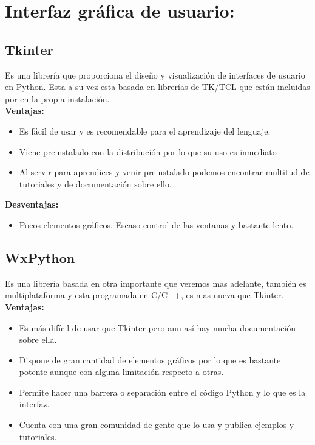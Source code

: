 
\section{Interfaz gráfica de usuario:}
\subsection{Tkinter}
Es una librería que proporciona el diseño y visualización de interfaces de usuario en Python. Esta a su vez esta basada en librerías de TK/TCL que están incluidas por en la propia instalación.
\\

\textbf{Ventajas:}

\begin{itemize}
\item Es fácil de usar y es recomendable para el aprendizaje del lenguaje.

\item Viene preinstalado con la distribución por lo que su uso es inmediato

\item Al servir para aprendices y venir preinstalado podemos encontrar multitud de tutoriales y de documentación sobre ello.
\end{itemize}

\textbf{Desventajas:}

\begin{itemize}
\item Pocos elementos gráficos. Escaso control de las ventanas y bastante lento.
\end{itemize}

\subsection{WxPython}
Es una librería basada en otra importante que veremos mas adelante, también es multiplataforma y esta programada en C/C++, es mas nueva que Tkinter.
\\

\textbf{Ventajas:}

\begin{itemize}
\item Es más difícil de usar que Tkinter pero aun así hay mucha documentación sobre ella.

\item Dispone de gran cantidad de elementos gráficos por lo que es bastante potente aunque con alguna limitación respecto a otras.

\item Permite hacer una barrera o separación entre el código Python y lo que es la interfaz.
\item Cuenta con una gran comunidad de gente que lo usa y publica ejemplos y tutoriales.
\end{itemize}

